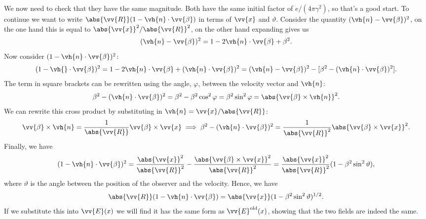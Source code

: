 \documentclass[fleqn]{NotesClass}
\begin{document}
    We now need to check that they have the same magnitude.
    Both have the same initial factor of \(e/(4\pi \gamma^2)\), so that's a good start.
    To continue we want to write \(\abs{\vv{R}}(1 - \vh{n} \cdot \vv{\beta})\) in terms of \(\vv{x}\) and \(\vartheta\).
    Consider the quantity \((\vh{n} - \vv{\beta})^2\), on the one hand this is equal to \(\abs{\vv{x}}^2 / \abs{\vv{R}}^2\), on the other hand expanding gives us
    \begin{equation}
        (\vh{n} - \vv{\beta})^2 = 1 - 2 \vh{n} \cdot \vv{\beta} + \beta^2.
    \end{equation}
    Now consider \((1 - \vh{n} \cdot \vv{\beta})^2\):
    \begin{equation}
        (1 - \vh{} \cdot \vv{\beta})^2 = 1 - 2 \vh{n} \cdot \vv{\beta} + (\vh{n} \cdot \vv{\beta})^2 = (\vh{n} - \vv{\beta})^2 - [\beta^2 - (\vh{n} \cdot \vv{\beta})^2].
    \end{equation}
    The term in square brackets can be rewritten using the angle, \(\varphi\), between the velocity vector and \(\vh{n}\):
    \begin{equation}
        \beta^2 - (\vh{n} \cdot \vv{\beta})^2 = \beta^2 - \beta^2 \cos^2\varphi = \beta^2 \sin^2 \varphi = \abs{\vv{\beta} \times \vh{n}}^2.
    \end{equation}
    We can rewrite this cross product by substituting in \(\vh{n} = \vv{x}/\abs{\vv{R}}\):
    \begin{equation}
        \vv{\beta} \times \vh{n} = \frac{1}{\abs{\vv{R}}}\vv{\beta} \times \vv{x} \implies \beta^2 - (\vh{n} \cdot \vv{\beta})^2 = \frac{1}{\abs{\vv{R}}^2}\abs{\vv{\beta} \times \vv{x}}^2.
    \end{equation}
    Finally, we have
    \begin{equation}
        (1 - \vh{n} \cdot \vv{\beta})^2 = \frac{\abs{\vv{x}}^2}{\abs{\vv{R}}^2} - \frac{\abs{\vv{\beta} \times \vv{x}}^2}{\abs{\vv{R}}^2} = \frac{\abs{\vv{x}}^2}{\abs{\vv{R}}^2}(1 - \beta^2 \sin^2 \vartheta),
    \end{equation}
    where \(\vartheta\) is the angle between the position of the observer and the velocity.
    Hence, we have
    \begin{equation}
        \abs{\vv{R}}(1 - \vh{n} \cdot \vv{\beta}) = \abs{\vv{x}}(1 - \beta^2 \sin^2\vartheta)^{1/2}.
    \end{equation}
    If we substitute this into \(\vv{E}(x)\) we will find it has the same form as \(\vv{E}^{\text{old}}(x)\), showing that the two fields are indeed the same.
    
\end{document}
